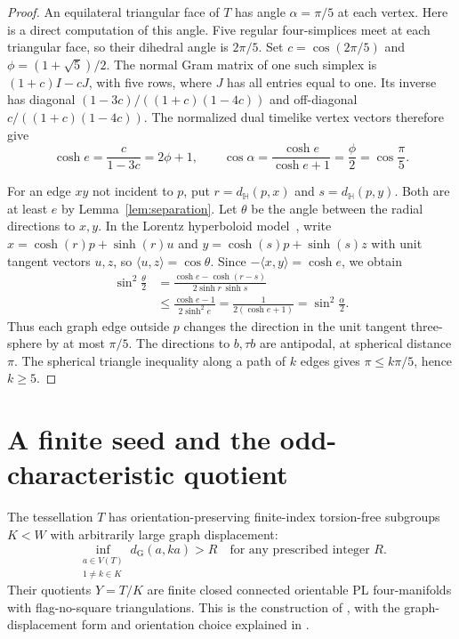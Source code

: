 \documentclass[11pt]{article}
\newcommand{\dist}{d_{\mathrm G}}
\begin{document}
\begin{proof}
An equilateral triangular face of $T$ has angle $\alpha=\pi/5$
at each vertex. Here is a direct computation of this angle.
Five regular four-simplices meet at each triangular face,
so their dihedral angle is $2\pi/5$.
Set $c=\cos(2\pi/5)$ and $\phi=(1+\sqrt5)/2$.
The normal Gram matrix of one such simplex is
$(1+c)I-cJ$, with five rows, where $J$ has all entries equal
to one. Its inverse has diagonal
$(1-3c)/((1+c)(1-4c))$ and off-diagonal
$c/((1+c)(1-4c))$. The normalized dual timelike vertex
vectors therefore give
\[
  \cosh e=\frac{c}{1-3c}=2\phi+1,
  \qquad
  \cos\alpha=\frac{\cosh e}{\cosh e+1}
             =\frac{\phi}{2}=\cos\frac{\pi}{5}.
\]

For an edge $xy$ not incident to $p$, put
$r=d_{\mathbb H}(p,x)$ and $s=d_{\mathbb H}(p,y)$.
Both are at least $e$ by Lemma~\ref{lem:separation}.
Let $\theta$ be the angle between the radial directions to $x,y$.
In the Lorentz hyperboloid model~\cite[Section~5.1]{Heckman},
write
$x=\cosh(r)p+\sinh(r)u$ and
$y=\cosh(s)p+\sinh(s)z$ with unit tangent vectors $u,z$,
so $\langle u,z\rangle=\cos\theta$.
Since $-\langle x,y\rangle=\cosh e$, we obtain
\begin{align*}
 \sin^2\frac{\theta}{2}
 &=\frac{\cosh e-\cosh(r-s)}{2\sinh r\,\sinh s}\\
 &\leq\frac{\cosh e-1}{2\sinh^2 e}
  =\frac{1}{2(\cosh e+1)}
  =\sin^2\frac{\alpha}{2}.
\end{align*}
Thus each graph edge outside $p$ changes the direction in the
unit tangent three-sphere by at most $\pi/5$.
The directions to $b,\tau b$ are antipodal, at spherical distance
$\pi$. The spherical triangle inequality along a path of $k$
edges gives $\pi\leq k\pi/5$, hence $k\geq 5$.
\end{proof}

\section{A finite seed and the odd-characteristic quotient}

The tessellation $T$ has orientation-preserving finite-index
torsion-free subgroups $K<W$ with arbitrarily large graph
displacement:
\[
 \inf_{\substack{a\in V(T)\\1\ne k\in K}}\dist(a,ka)>R
 \quad\text{for any prescribed integer }R.
\]
Their quotients $Y=T/K$ are finite closed connected orientable
PL four-manifolds with flag-no-square triangulations. This is the
construction of \cite[Remark~4.4(2)]{PS}, with the graph-displacement
form and orientation choice explained in \cite[p.~3]{KNS}.
\end{document}

